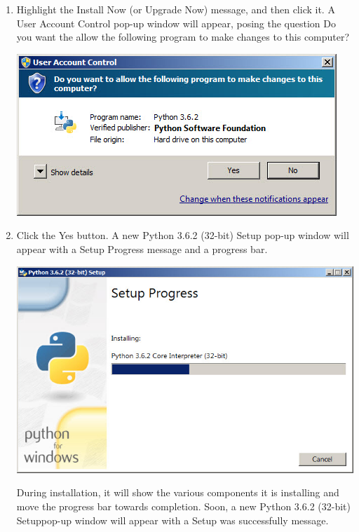 \documentclass[11pt]{article}
\begin{document}
\begin{multicols}{2}
\begin{enumerate}
\item Highlight the Install Now (or Upgrade Now) message, and then click it.
A User Account Control pop-up window will appear, posing the question Do you want the allow the following program to make changes to this computer?
\begin{center}
\includegraphics[scale=0.60]{5.jpg} \\ 
\end{center}
\item Click the Yes button.
A new Python 3.6.2 (32-bit) Setup pop-up window will appear with a Setup Progress message and a progress bar.
\begin{center}
\includegraphics[scale=0.43]{6.jpg} \\ 
\end{center}
During installation, it will show the various components it is installing and move the progress bar towards completion. Soon, a new Python 3.6.2 (32-bit) Setuppop-up window will appear with a Setup was successfully message.
\begin{center}

\end{center}
\end{enumerate}
\end{multicols}
\end{document}
